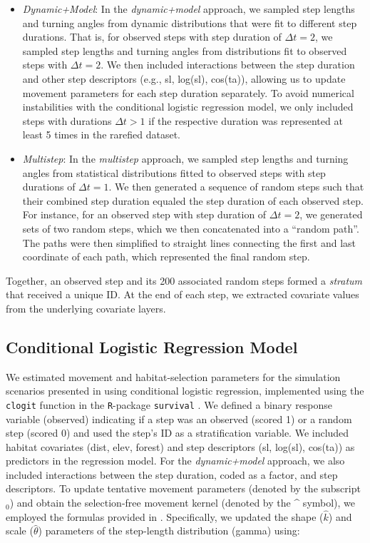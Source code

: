 \documentclass[../FinalThesis.tex]{subfiles}
\begin{document}
\begin{itemize}
  \item \textit{Dynamic+Model}: In the \textit{dynamic+model} approach, we
  sampled step lengths and turning angles from dynamic distributions that were
  fit to different step durations. That is, for observed steps with
  step duration of $\Delta t = 2$, we sampled step lengths and turning angles
  from distributions fit to observed steps with $\Delta t = 2$. We then included
  interactions between the step duration and other step descriptors (e.g., sl,
  log(sl), cos(ta)), allowing us to update movement parameters for each
  step duration separately. To avoid numerical instabilities with the
  conditional logistic regression model, we only included steps with durations
  $\Delta t > 1$ if the respective duration was represented at least 5 times in
  the rarefied dataset.

  \item \textit{Multistep}: In the \textit{multistep} approach, we sampled
  step lengths and turning angles from statistical distributions fitted to
  observed steps with step durations of $\Delta t = 1$. We then generated a
  sequence of random steps such that their combined step duration equaled the
  step duration of each observed step.  For instance, for an observed step with
  step duration of $\Delta t = 2$, we generated sets of two random steps, which
  we then concatenated into a ``random path''. The paths were then simplified to
  straight lines connecting the first and last coordinate of each path, which
  represented the final random step.

\end{itemize}

\noindent Together, an observed step and its 200 associated random steps formed
a \textit{stratum} that received a unique ID. At the end of each step, we
extracted covariate values from the underlying covariate layers.

\subsection{Conditional Logistic Regression Model}

We estimated movement and habitat-selection parameters for the simulation
scenarios presented in  using conditional logistic regression,
implemented using the \texttt{clogit} function in the \texttt{R}-package
\texttt{survival} \citep{Therneau.2024}. We defined a binary response variable
(\textsf{observed}) indicating if a step was an observed (scored 1) or a random
step (scored 0) and used the step's ID as a stratification variable. We included
habitat covariates (dist, elev, forest) and step descriptors (sl, log(sl),
cos(ta)) as predictors in the regression model. For the \textit{dynamic+model}
approach, we also included interactions between the step duration, coded as a
factor, and step descriptors. To update tentative movement parameters (denoted
by the subscript $_0$) and obtain the selection-free movement kernel (denoted by
the \string^ symbol), we employed the formulas provided in \citep{Avgar.2016,
Fieberg.2021}. Specifically, we updated the shape ($\hat{k}$) and scale
($\hat{\theta}$) parameters of the step-length distribution (gamma) using:
\end{document}
